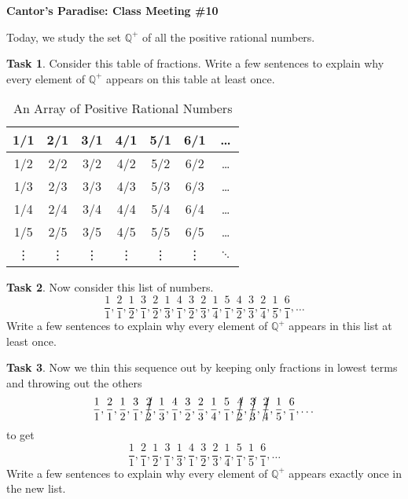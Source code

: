 \documentclass[12pt]{amsart}
\theoremstyle{definition}
\newtheorem{task}{Task}
\begin{document}
\begin{center}
\textbf{\Huge
Cantor's Paradise: Class Meeting \#10
}
\end{center}


\vspace{.5in}

Today, we study the set $\mathbb{Q}^+$ of all the positive rational numbers.
 
\begin{task}
Consider this table of fractions. Write a few sentences to explain why every element of $\mathbb{Q}^+$ appears on this table at least once.
\begin{table}[htdp]
\begin{center}
\begin{tabular}{|c|c|c|c|c|c|c|}
\hline
1/1 & 2/1 & 3/1 & 4/1& 5/1 & 6/1& \dots \\
\hline
1/2 & 2/2 & 3/2 & 4/2 & 5/2 & 6/2& \dots \\
\hline
1/3 & 2/3 & 3/3 & 4/3 & 5/3 & 6/3& \dots \\
\hline
1/4 & 2/4 & 3/4 & 4/4 & 5/4 & 6/4& \dots \\
\hline
1/5 & 2/5 & 3/5 & 4/5 & 5/5 & 6/5& \dots \\
\hline
\vdots & \vdots & \vdots & \vdots & \vdots & \vdots & $\ddots$ \\
\hline
\end{tabular}
\end{center}
\label{default}
\caption{An Array of Positive Rational Numbers}
\end{table}%
\end{task}

\vspace{2in}

\begin{task} Now consider this list of numbers.
\[
\frac{1}{1}, \frac{2}{1}, \frac{1}{2}, \frac{3}{1}, \frac{2}{2}, \frac{1}{3}, \frac{4}{1}, \frac{3}{2}, \frac{2}{3}, \frac{1}{4}, \frac{5}{1}, \frac{4}{2}, \frac{3}{3}, \frac{2}{4}, \frac{1}{5}, \frac{6}{1}, \dots
\]
Write a few sentences to explain why every element of $\mathbb{Q}^+$ appears in this list at least once.\\
\end{task}

\clearpage

\begin{task}
Now we thin this sequence out by keeping only fractions in lowest terms and throwing out the others
\[
\frac{1}{1}, \frac{2}{1}, \frac{1}{2}, \frac{3}{1}, \cancel{\frac{2}{2}}, \frac{1}{3}, \frac{4}{1}, \frac{3}{2}, \frac{2}{3}, \frac{1}{4}, \frac{5}{1}, \cancel{\frac{4}{2}}, \cancel{\frac{3}{3}}, \cancel{\frac{2}{4}}, \frac{1}{5}, \frac{6}{1}, \dots
\]
to get
\[
\frac{1}{1}, \frac{2}{1}, \frac{1}{2}, \frac{3}{1}, \frac{1}{3}, \frac{4}{1}, \frac{3}{2}, \frac{2}{3}, \frac{1}{4}, \frac{5}{1}, \frac{1}{5}, \frac{6}{1}, \dots
\]
Write a few sentences to explain why every element of $\mathbb{Q}^+$ appears exactly once in the new list.\\
\end{task}
\end{document}
